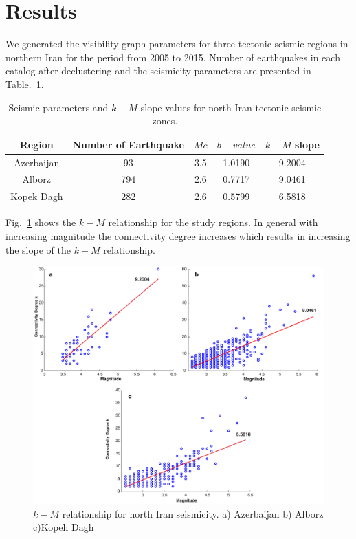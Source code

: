 
\section{Results}
\noindent
We generated the visibility graph parameters for three tectonic seismic regions in northern Iran for the period from 2005 to 2015. Number of earthquakes in each catalog after declustering and the seismicity parameters are presented in Table.~\ref{tab:b_k_m_param}. 


\begin{table}[h]
\centering
\caption{Seismic parameters and $k-M$ slope values for north Iran tectonic seismic zones.}
\begin{tabular}{ccccc}
Region          & Number of Earthquake &  $Mc$ &  $b-value$ & $k-M$ slope \\ \hline
Azerbaijan     & 93                                 & 3.5   & 1.0190  & 9.2004       \\ \hline
Alborz            & 794                               & 2.6   & 0.7717  & 9.0461      \\ \hline
Kopek Dagh  & 282                               & 2.6   & 0.5799  & 6.5818     \\ \hline
\end{tabular}
\label{tab:b_k_m_param}
\end{table}

\noindent
Fig.~\ref{fig:k_m_plot_m} shows the $k-M$ relationship for the study regions.  In general with increasing magnitude the connectivity degree increases which results in increasing the slope of the $k-M$ relationship. 

\begin{figure} [ht]
\centering
\includegraphics[scale=0.35]{figures/pdf/Figure05.pdf} 
\caption{ $k-M$ relationship for north Iran seismicity. a) Azerbaijan b) Alborz c)Kopeh Dagh}
\label{fig:k_m_plot_m}
\end{figure}

